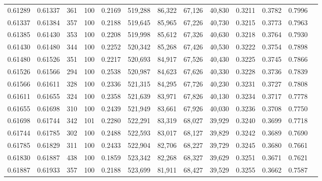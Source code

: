 \begin{tabular}{rrrrrrrrrrrrr}
0.61289 & 0.61337 &   361 & 100 &                                     0.2169 & 519,288 &  86,322 &  67,126 &  40,830 & 0.3211 & 0.3782 & 0.7996 \\
0.61337 & 0.61384 &   357 & 100 &                                     0.2188 & 519,645 &  85,965 &  67,226 &  40,730 & 0.3215 & 0.3773 & 0.7963 \\
0.61385 & 0.61430 &   353 & 100 &                                     0.2208 & 519,998 &  85,612 &  67,326 &  40,630 & 0.3218 & 0.3764 & 0.7930 \\
0.61430 & 0.61480 &   344 & 100 &                                     0.2252 & 520,342 &  85,268 &  67,426 &  40,530 & 0.3222 & 0.3754 & 0.7898 \\
0.61480 & 0.61526 &   351 & 100 &                                     0.2217 & 520,693 &  84,917 &  67,526 &  40,430 & 0.3225 & 0.3745 & 0.7866 \\
0.61526 & 0.61566 &   294 & 100 &                                     0.2538 & 520,987 &  84,623 &  67,626 &  40,330 & 0.3228 & 0.3736 & 0.7839 \\
0.61566 & 0.61611 &   328 & 100 &                                     0.2336 & 521,315 &  84,295 &  67,726 &  40,230 & 0.3231 & 0.3727 & 0.7808 \\
0.61611 & 0.61655 &   324 & 100 &                                     0.2358 & 521,639 &  83,971 &  67,826 &  40,130 & 0.3234 & 0.3717 & 0.7778 \\
0.61655 & 0.61698 &   310 & 100 &                                     0.2439 & 521,949 &  83,661 &  67,926 &  40,030 & 0.3236 & 0.3708 & 0.7750 \\
0.61698 & 0.61744 &   342 & 101 &                                     0.2280 & 522,291 &  83,319 &  68,027 &  39,929 & 0.3240 & 0.3699 & 0.7718 \\
0.61744 & 0.61785 &   302 & 100 &                                     0.2488 & 522,593 &  83,017 &  68,127 &  39,829 & 0.3242 & 0.3689 & 0.7690 \\
0.61785 & 0.61829 &   311 & 100 &                                     0.2433 & 522,904 &  82,706 &  68,227 &  39,729 & 0.3245 & 0.3680 & 0.7661 \\
0.61830 & 0.61887 &   438 & 100 &                                     0.1859 & 523,342 &  82,268 &  68,327 &  39,629 & 0.3251 & 0.3671 & 0.7621 \\
0.61887 & 0.61933 &   357 & 100 &                                     0.2188 & 523,699 &  81,911 &  68,427 &  39,529 & 0.3255 & 0.3662 & 0.7587 \\

\end{tabular}
